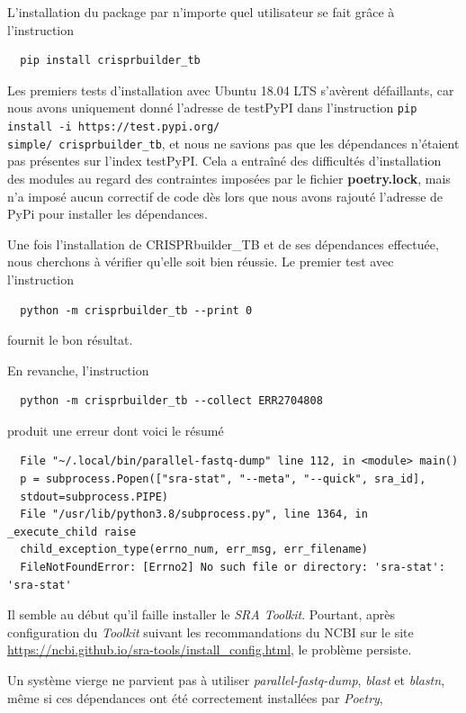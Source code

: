 \documentclass[twoside,a4paper,11pt,frenchb,openany]{report}
\begin{document}
L’installation du package par n'importe quel utilisateur se fait grâce à l’instruction
\begin{verbatim}  pip install crisprbuilder_tb\end{verbatim}

Les premiers tests d'installation avec Ubuntu 18.04 LTS s'avèrent défaillants, car nous avons uniquement donné l'adresse de testPyPI dans l'instruction \texttt{pip install -i https://test.pypi.org/\\simple/ crisprbuilder\_tb}, et nous ne savions pas que les dépendances n'étaient pas présentes sur l'index testPyPI. Cela a entraîné des difficultés d'installation des modules au regard des contraintes imposées par le fichier \textbf{poetry.lock}, mais n'a imposé aucun correctif de code dès lors que nous avons rajouté l'adresse de PyPi pour installer les dépendances.

Une fois l'installation de CRISPRbuilder\_TB et de ses dépendances effectuée, nous cherchons à vérifier qu'elle soit bien réussie. Le premier test avec l'instruction

\begin{verbatim}
  python -m crisprbuilder_tb --print 0
\end{verbatim}

fournit le bon résultat.

En revanche, l'instruction

\begin{verbatim}
  python -m crisprbuilder_tb --collect ERR2704808
\end{verbatim}

produit une erreur dont voici le résumé

\begin{verbatim}
  File "~/.local/bin/parallel-fastq-dump" line 112, in <module> main()
  p = subprocess.Popen(["sra-stat", "--meta", "--quick", sra_id], 
  stdout=subprocess.PIPE)
  File "/usr/lib/python3.8/subprocess.py", line 1364, in _execute_child raise 
  child_exception_type(errno_num, err_msg, err_filename)
  FileNotFoundError: [Errno2] No such file or directory: 'sra-stat': 'sra-stat'
\end{verbatim}

Il semble au début qu'il faille installer le \textit{SRA Toolkit}. Pourtant, après configuration du \textit{Toolkit} suivant les recommandations du NCBI sur le site \url{https://ncbi.github.io/sra-tools/install_config.html}, le problème persiste.

Un système vierge ne parvient pas à utiliser \textit{parallel-fastq-dump}, \textit{blast} et \textit{blastn}, même si ces dépendances ont été correctement installées par \textit{Poetry}, 
\end{document}
